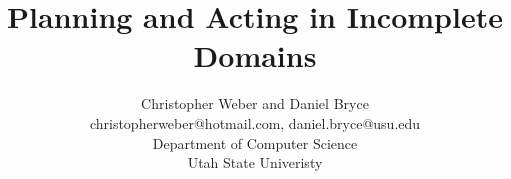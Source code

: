 \documentclass{article}
\begin{document}
\title{Planning and Acting in Incomplete Domains
}

\author{%
Christopher Weber and Daniel Bryce\\
christopherweber@hotmail.com, daniel.bryce@usu.edu\\
Department of Computer Science\\
Utah State Univeristy
}




\maketitle
\end{document}
